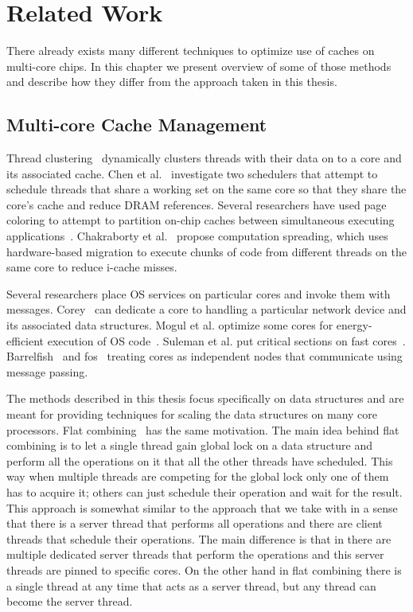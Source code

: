 \chapter{Related Work}

There already exists many different techniques to optimize use of caches on multi-core chips.
In this chapter we present overview of some of those methods and describe how they differ from the approach
taken in this thesis.

\section{Multi-core Cache Management}

Thread clustering~\cite{tam:threadclustering} dynamically clusters
threads with their data on to a core and its associated cache. Chen et
al.~\cite{chen-07} investigate two schedulers that attempt to schedule
threads that share a working set on the same core so that they share
the core's cache and reduce DRAM references.  Several researchers have
used page coloring to attempt to partition on-chip caches between
simultaneous executing applications~\cite{cho:micro,tam:sharedl2,lin:partitionl2,soares:pollute,zhang:pagecolor}. 
Chakraborty et al.~\cite{koushik:csp} propose computation spreading, which uses
hardware-based migration to execute chunks of code from different
threads on the same core to reduce i-cache misses.

Several researchers place OS services on particular cores and invoke them with messages.
Corey~\cite{corey:osdi08} can dedicate a core to handling a particular network device and its
associated data structures.  Mogul et al. optimize some cores for energy-efficient execution of OS code~\cite{mogul:micro}.
Suleman et al. put critical sections on fast cores~\cite{suleman:acs}.
Barrelfish~\cite{barrelfish} and fos~\cite{wentzlaff:fos} treating cores as independent nodes that
communicate using message passing. 

The methods described in this thesis focus specifically on data structures and are meant for providing techniques for scaling the 
data structures on many core processors. Flat combining~\cite{flatcombining} has the same motivation. The main idea behind flat combining
is to let a single thread gain global lock on a data structure and perform all the operations on it that all the other threads
have scheduled. This way when multiple threads are competing for the global lock only one of them has to acquire it; others can just
schedule their operation and wait for the result. This approach is somewhat similar to the approach that we take with \cphash{} in a sense that 
there is a server thread that performs all operations and there are client threads that schedule their operations. The main difference is
that in \cphash{} there are multiple dedicated server threads that perform the operations and this server threads are pinned to specific cores.
On the other hand in flat combining there is a single thread at any time that acts as a server thread, but any thread can become the
server thread.

